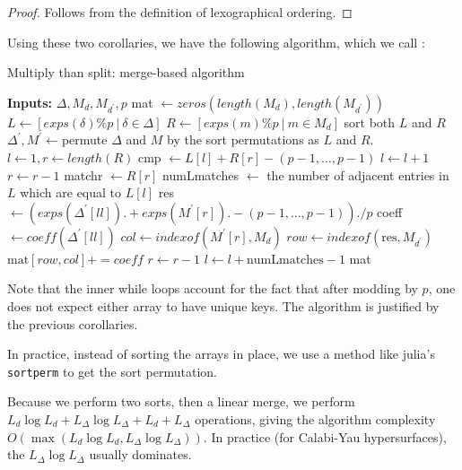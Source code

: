 \begin{proof}
	Follows from the definition of lexographical
	ordering.
\end{proof}

Using these two corollaries, we have the following algorithm,
which we call \merge:

\begin{algorithm}[H]
\caption{Multiply than split: merge-based algorithm}
\label{alg:theta:merge}
\begin{algorithmic}[1]
\State \textbf{Inputs:} \(\Delta, M_{d}, M_{d^{\prime}}, p\)
\State mat \(\gets zeros(length(M_{d}), length(M_{d^{\prime}}))\) 
\State $L \gets [exps(\delta) \% p ~|~ \delta \in \Delta]$
\State $R \gets [exps(m) \% p ~|~ m \in M_{d}]$
\State sort both  \(L\) and \(R\) 
\State \(\Delta^{\prime}, M^{\prime} \gets \)permute \(\Delta\) and \(M\) by the sort permutations as \(L\) and \(R\).
\State \(l \gets 1, r \gets length(R)\)
	\State cmp \(\gets L[l] + R[r] - (p-1, \ldots, p-1)\) 
	    \State \(l \gets l + 1\) 
	    \State \(r \gets r - 1\)
        \State matchr \(\gets R[r]\) 
        \State numLmatches \(\gets\) the number of adjacent entries in \(L\) which are equal to \(L[l]\) 
                \State res \(\gets (exps(\Delta^{\prime}[ll]) .+ exps(M^{\prime}[r]) .- (p-1, \ldots, p-1)) ./ p\) 
                \State coeff \(\gets coeff(\Delta^{\prime}[ll])\)
                \State \(col \gets indexof(M^{\prime}[r],M_{d})\)
                \State \(row \gets indexof(\text{res},M_{d^{\prime}})\)
                \State \(\text{mat}[row,col] += coeff\) 
            \EndFor
            \State \(r \gets r - 1\)
        \EndWhile     
        \State \(l \gets l + \text{numLmatches} - 1\) 
    \EndIf
\EndWhile
\State \Return mat
\end{algorithmic}
\end{algorithm}

Note that the inner while loops account for the fact that
after modding by \(p\), one does not expect 
either array to have unique keys.
The algorithm is justified by the previous corollaries.

In practice, instead of sorting the arrays in place, 
we use a method like julia's \texttt{sortperm}
to get the sort permutation.

Because we perform two sorts, then a linear merge, we perform $L_{d} \log L_{d} + L_{\Delta} \log L_{\Delta} + L_{d} + L_{\Delta}$ operations, 
giving the algorithm complexity $O(\max(L_{d} \log L_{d}, L_{\Delta} \log L_{\Delta}))$.
In practice (for Calabi-Yau hypersurfaces), the $L_{\Delta} \log L_{\Delta}$ usually dominates.


